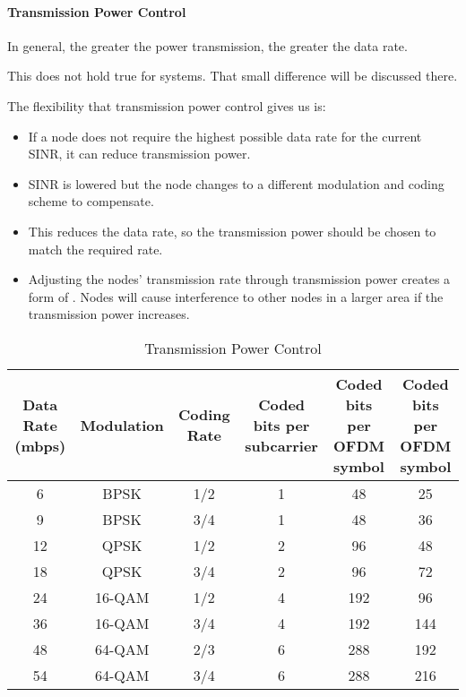 \paragraph{Transmission Power Control}\label{par:Transmission_Power_Control}
In general, the greater the power transmission, the greater the data rate.
\begin{remark*}
  This does not hold true for  systems.
  That small difference will be discussed there.
\end{remark*}

The flexibility that transmission power control gives us is:
\begin{itemize}[noitemsep]
\item If a node does not require the highest possible data rate for the current SINR, it can reduce transmission power.
\item SINR is lowered but the node changes to a different modulation and coding scheme to compensate.
\item This reduces the data rate, so the transmission power should be chosen to match the required rate.
\item Adjusting the nodes' transmission rate through transmission power creates a form of . Nodes will cause interference to other nodes in a larger area if the transmission power increases.
\end{itemize}

\begin{table}[h!]
  \centering
  \begin{tabular}{cccccc}
    \toprule
    \multicolumn{1}{p{1.6cm}}{Data Rate (mbps)} & Modulation & Coding Rate & \multicolumn{1}{p{2.2cm}}{Coded bits per subcarrier} & \multicolumn{1}{p{2.5cm}}{Coded bits per OFDM symbol} & \multicolumn{1}{p{2.5cm}}{Coded bits per OFDM symbol} \\
    \midrule
    6 & BPSK & 1/2 & 1 & 48 & 25 \\
    9 & BPSK & 3/4 & 1 & 48 & 36 \\
    12 & QPSK & 1/2 & 2 & 96 & 48 \\
    18 & QPSK & 3/4 & 2 & 96 & 72 \\
    24 & 16-QAM & 1/2 & 4 & 192 & 96 \\
    36 & 16-QAM & 3/4 & 4 & 192 & 144 \\
    48 & 64-QAM & 2/3 & 6 & 288 & 192 \\
    54 & 64-QAM & 3/4 & 6 & 288 & 216 \\
    \bottomrule
  \end{tabular}
  \caption{Transmission Power Control}
  \label{tab:Transmission_Power_Control}
\end{table}

